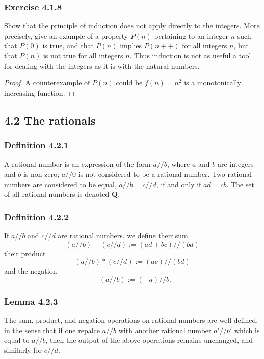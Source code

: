 \documentclass[12pt, letter]{article}
\begin{document}
\subsubsection*{Exercise 4.1.8}
Show that the principle of induction does not apply directly to the integers. More precisely, give an example of a property $P(n)$ pertaining to an integer $n$
such that $P(0)$ is true, and that $P(n)$ implies $P(n++)$ for all integers $n$, but that $P(n)$ is not true for all integers $n$. Thus induction is not as useful a tool for
dealing with the integers as it is with the natural numbers.
\begin{proof}
    A counterexample of $P(n)$ could be $f(n)=n^2$ is a monotonically increasing function. 
\end{proof}
\subsection*{4.2 The rationals}
\subsubsection*{Definition 4.2.1}
A rational number is an expression of the form $a//b$, where $a$ and $b$ are integers and $b$ is non-zero; $a//0$ is not considered to be a rational number. Two rational numbers 
are considered to be equal, $a//b=c//d$, if and only if $ad=cb$. The set of all rational numbers is denoted $\mathbf{Q}$.
\subsubsection*{Definition 4.2.2}
If $a//b$ and $c//d$ are rational numbers, we define their sum 
\begin{equation*}
    (a//b)+(c//d):=(ad+bc)//(bd)
\end{equation*}
their product
\begin{equation*}
    (a//b)*(c//d):=(ac)//(bd)
\end{equation*}
and the negation 
\begin{equation*}
    -(a//b):=(-a)//b.
\end{equation*}
\subsubsection*{Lemma 4.2.3}
The sum, product, and negation operations on rational numbers are well-defined, in the sense that if one repalce $a//b$ with another rational number $a'//b'$
which is equal to $a//b$, then the output of the above operations remains unchanged, and similarly for $c//d$.
\end{document}
